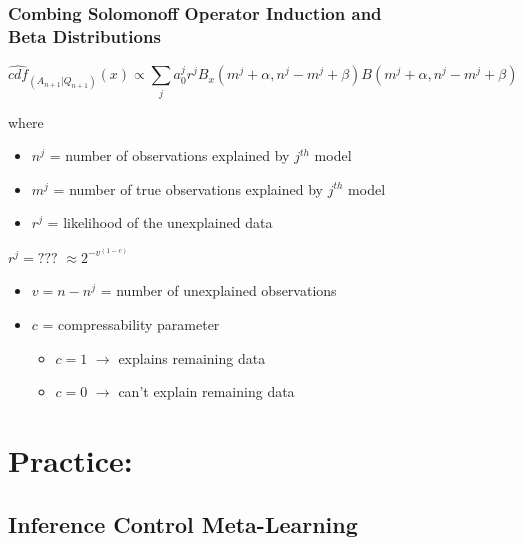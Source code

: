\documentclass{beamer}
\begin{document}
\begin{frame}
  \frametitle{Combing Solomonoff Operator Induction and\\
    Beta Distributions}

  $$
    \hat{cdf}_{(A_{n+1}|Q_{n+1})}(x) \propto \sum_j a_0^j r^j
    B_x(m^j+\alpha, n^j-m^j+\beta)
    B(m^j+\alpha, n^j-m^j+\beta)
  $$

  where
  \begin{itemize}
  \item $n^j$ = number of observations explained by $j^{th}$ model    
  \item $m^j$ = number of true observations explained by $j^{th}$ model
  \item $r^j$ = likelihood of the unexplained data
  \end{itemize}

  $r^j = ???$ \pause $\approx 2^{-v^{(1-c)}}$
  \begin{itemize}
  \item $v = n-n^j$ = number of unexplained observations
  \item $c$ = compressability parameter
    \begin{itemize}
    \item $c=1$ $\rightarrow$ explains remaining data%
    \item $c=0$ $\rightarrow$ can't explain remaining data
    \end{itemize}
  \end{itemize}
\end{frame}

\section{Practice:}
\subsection{Inference Control Meta-Learning}
\end{document}
